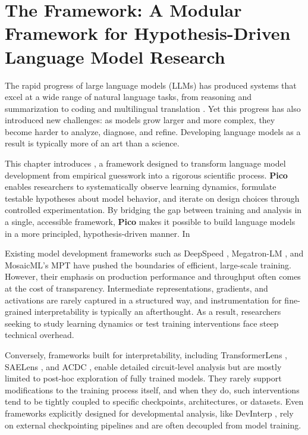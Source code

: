 \chapter[The \picomed Framework: A Modular Framework for Hypothesis-Driven Language Model Research]{The \picosupabig Framework: A Modular Framework for Hypothesis-Driven Language Model Research}
\label{sec:pico-intro}

The rapid progress of large language models (LLMs) has produced systems that excel at a wide range of natural language tasks, from reasoning and summarization to coding and multilingual translation \citep{hendrycks2021mmlu, cobbe2021gsm8k, srivastava2023bigbench}. Yet this progress has also introduced new challenges: as models grow larger and more complex, they become harder to analyze, diagnose, and refine. Developing language models as a result is typically more of an art than a science.

This chapter introduces \pico, a framework designed to transform language model development from empirical guesswork into a rigorous scientific process. \textbf{Pico} enables researchers to systematically observe learning dynamics, formulate testable hypotheses about model behavior, and iterate on design choices through controlled experimentation. By bridging the gap between training and analysis in a single, accessible framework, \textbf{Pico} makes it possible to build language models in a more principled, hypothesis-driven manner. In 


Existing model development frameworks such as DeepSpeed \citep{rasley2020deepspeed}, Megatron-LM \citep{narayanan2021megatron}, and MosaicML's MPT \citep{mosaic2023mpt} have pushed the boundaries of efficient, large-scale training. However, their emphasis on production performance and throughput often comes at the cost of transparency. Intermediate representations, gradients, and activations are rarely captured in a structured way, and instrumentation for fine-grained interpretability is typically an afterthought. As a result, researchers seeking to study learning dynamics or test training interventions face steep technical overhead.

Conversely, frameworks built for interpretability, including TransformerLens \citep{nanda2022transformerlens}, SAELens \citep{bloom2024saelens}, and ACDC \citep{conmy2023towards}, enable detailed circuit-level analysis but are mostly limited to post-hoc exploration of fully trained models. They rarely support modifications to the training process itself, and when they do, such interventions tend to be tightly coupled to specific checkpoints, architectures, or datasets. Even frameworks explicitly designed for developmental analysis, like DevInterp \citep{devinterpcode}, rely on external checkpointing pipelines and are often decoupled from model training.

